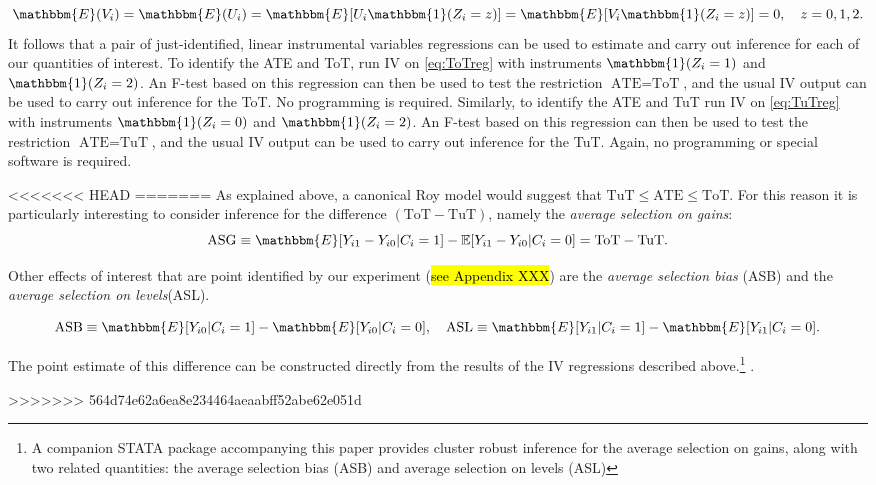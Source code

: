 \documentclass[oneside,11pt]{article}
\begin{document}
{\[
\mathbbm{E}(V_i) = \mathbbm{E}(U_i) = \mathbbm{E}[U_i \mathbbm{1}(Z_i = z)] = \mathbbm{E}[V_i \mathbbm{1}(Z_i = z)] = 0, \quad z = 0, 1, 2.
\]
It follows that a pair of just-identified, linear instrumental variables regressions can be used to estimate and carry out inference for each of our quantities of interest. To identify the ATE and ToT, run IV on \eqref{eq:ToTreg} with instruments $\mathbbm{1}(Z_i = 1)$ and $\mathbbm{1}(Z_i=2)$. An F-test based on this regression can then be used to test the restriction $\text{ATE} = \text{ToT}$, and the usual IV output can be used to carry out inference for the ToT. No programming is required. Similarly, to identify the ATE and TuT run IV on \ref{eq:TuTreg} with instruments $\mathbbm{1}(Z_i = 0)$ and $\mathbbm{1}(Z_i = 2)$. An F-test based on this regression can then be used to test the restriction $\text{ATE} = \text{TuT}$, and the usual IV output can be used to carry out inference for the TuT. Again, no programming or special software is required. 

<<<<<<< HEAD
=======
As explained above, a canonical Roy model would suggest that $\text{TuT} \leq \text{ATE} \leq \text{ToT}$. For this reason it is particularly interesting to consider inference for the difference $(\text{ToT} - \text{TuT})$, namely the \emph{average selection on gains}: 
\[
\text{ASG} \equiv \mathbbm{E}[Y_{i1} - Y_{i0}|C_i = 1] - \mathbb{E}[Y_{i1} - Y_{i0} | C_i = 0] = \text{ToT} - \text{TuT}.
\]

Other effects of interest that are point identified by our experiment (\hl{see Appendix XXX}) are the \emph{average selection bias} (ASB) and the \emph{average selection on levels}(ASL). 

\[
\text{ASB} \equiv \mathbbm{E}[Y_{i0}|C_i = 1] - \mathbbm{E}[Y_{i0}|C_i = 0], \quad 
\text{ASL} \equiv \mathbbm{E}[Y_{i1}|C_i = 1] - \mathbbm{E}[Y_{i1}|C_i = 0].
\]

\noindent The point estimate of this difference can be constructed directly from the results of the IV regressions described above.\footnote{A companion STATA package accompanying this paper provides cluster robust inference for the average selection on gains, along with two related quantities: the average selection bias (ASB) and average selection on levels (ASL)} .



>>>>>>> 564d74e62a6ea8e234464aeaabff52abe62e051d

}
\end{document}
